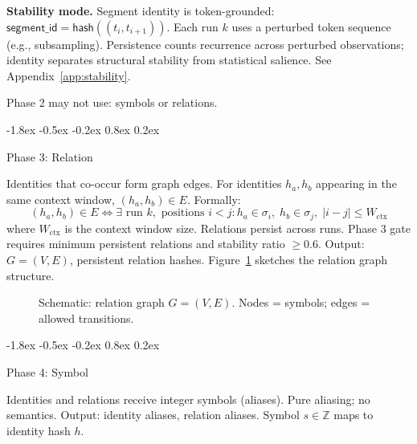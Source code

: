 \documentclass[10pt]{article}
\makeatletter
\renewcommand{\subsection}{\@startsection{subsection}{2}{\z@}%
  {-1.8ex \@plus -0.5ex \@minus -0.2ex}%
  {0.8ex \@plus 0.2ex}%
  {\normalsize\bfseries\raggedright}}
\makeatother
\begin{document}
\textbf{Stability mode.}
Segment identity is token-grounded: $\mathsf{segment\_id} = \mathsf{hash}((t_i, t_{i+1}))$. Each run $k$ uses a perturbed token sequence (e.g., subsampling). Persistence counts recurrence across perturbed observations; identity separates structural stability from statistical salience. See Appendix~\ref{app:stability}.

Phase 2 may not use: symbols or relations.

\subsection{Phase 3: Relation}

Identities that co-occur form graph edges. For identities $h_a, h_b$ appearing in the same context window, $(h_a, h_b) \in E$. Formally:
\begin{equation}
(h_a, h_b) \in E \iff \exists \text{ run } k, \text{ positions } i < j: h_a \in \sigma_i, \; h_b \in \sigma_j, \; |i - j| \leq W_{\text{ctx}}
\end{equation}
where $W_{\text{ctx}}$ is the context window size. Relations persist across runs. Phase 3 gate requires minimum persistent relations and stability ratio $\geq 0.6$. Output: $G = (V, E)$, persistent relation hashes. Figure~\ref{fig:graph} sketches the relation graph structure.

\begin{figure}[t]
\centering
{}
\caption{Schematic: relation graph $G=(V,E)$. Nodes = symbols; edges = allowed transitions.}
\label{fig:graph}
\end{figure}

\subsection{Phase 4: Symbol}

Identities and relations receive integer symbols (aliases). Pure aliasing; no semantics. Output: identity aliases, relation aliases. Symbol $s \in \mathbb{Z}$ maps to identity hash $h$.
\end{document}
